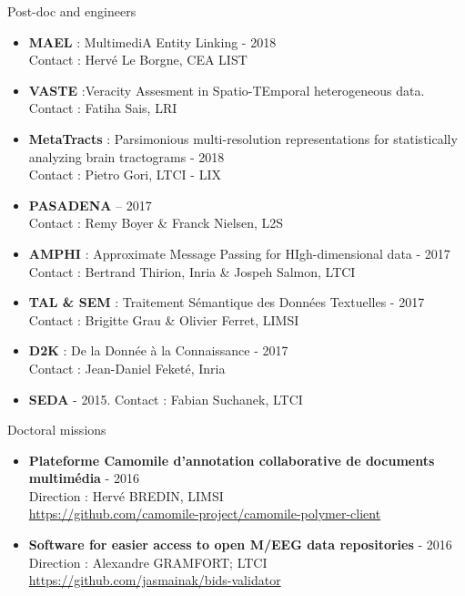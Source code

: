\begin{frame}{Post-doc and engineers}

\small
\begin{itemize}
\item 
\textbf{MAEL} : MultimediA Entity Linking - 2018
\\
Contact : Herv\'e Le Borgne, CEA LIST
\item
\textbf{VASTE} :Veracity Assesment in Spatio-TEmporal heterogeneous data. 
\\
Contact : Fatiha Sais, LRI
\item
\textbf{MetaTracts} : Parsimonious multi-resolution representations for 
statistically analyzing brain tractograms - 2018
\\
Contact : Pietro Gori, LTCI - LIX
\item
\textbf{PASADENA} 
– 2017
\\
Contact : Remy Boyer \& Franck Nielsen, L2S
\item
\textbf{AMPHI} : Approximate Message Passing for HIgh-dimensional data -  2017 
\\
Contact : Bertrand Thirion, Inria \& Jospeh Salmon, LTCI
\item
\textbf{TAL \& SEM} : Traitement S\'emantique des Donn\'ees Textuelles - 2017
\\
Contact : Brigitte Grau \& Olivier Ferret, LIMSI
\item
\textbf{D2K} : De la Donn\'ee \`a la Connaissance - 2017
\\
Contact : Jean-Daniel Feket\'e, Inria
\item
\textbf{SEDA} - 2015. Contact : Fabian Suchanek, LTCI
\end{itemize}
\end{frame}

\begin{frame}{Doctoral missions}

\begin{itemize}
\item
\textbf{
Plateforme Camomile d'annotation collaborative de documents multim\'edia} - 2016 \\
Direction : Herv\'e BREDIN, LIMSI \\
{\small
\color{blue}
\url{https://github.com/camomile-project/camomile-polymer-client}}
\item
\textbf{Software for easier access to open M/EEG data repositories} - 2016 \\ 
Direction : Alexandre GRAMFORT; LTCI
{\color{blue} \url{https://github.com/jasmainak/bids-validator}}
\end{itemize}
\end{frame}

